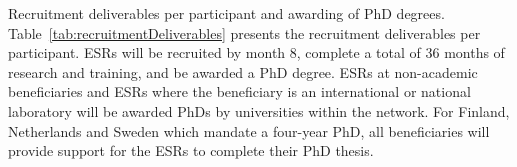 



\noindent \color{blue}Recruitment deliverables per participant and awarding of PhD degrees. \color{black}
Table~\ref{tab:recruitmentDeliverables} presents the recruitment deliverables per participant. 
ESRs will be recruited by month 8, complete a total of 36 months of research and training, and be awarded a PhD degree. 
ESRs at non-academic beneficiaries and ESRs where the beneficiary is an international or national laboratory will be awarded PhDs by universities within the network. 
For Finland, Netherlands and Sweden which mandate a four-year PhD, all beneficiaries will provide support for the ESRs to complete their PhD thesis.

